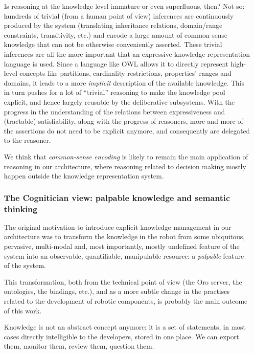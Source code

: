 \documentclass[letterpaper, 10 pt, conference]{ieeeconf}  %
\begin{document}
Is reasoning at the knowledge level immature or even superfluous, then? Not so:
hundreds of trivial (from a human point of view) inferences are continuously
produced by the system (translating inheritance relations, domain/range
constraints, transitivity, etc.) and encode a large amount of common-sense
knowledge that can not be otherwise conveniently asserted. These trivial
inferences are all the more important that an expressive knowledge
representation language is used. Since a language like OWL allows it to
directly represent high-level concepts like partitions, cardinality
restrictions, properties' ranges and domains, it leads to a more
\emph{implicit} description of the available knowledge.  This in turn pushes
for a lot of ``trivial'' reasoning to make the knowledge pool explicit, and
hence largely reusable by the deliberative subsystems. With the progress in the
understanding of the relations between expressiveness and (tractable)
satisfiability, along with the progress of reasoners, more and more of the
assertions do not need to be explicit anymore, and consequently are delegated
to the reasoner.

We think that \emph{common-sense encoding} is likely to remain the main
application of reasoning in our architecture, where reasoning related
to decision making mostly happen outside the knowledge representation system.


\subsubsection{The Cognitician view: palpable knowledge and semantic thinking}

The original motivation to introduce explicit knowledge management in our
architecture was to transform the knowledge in the robot from some ubiquitous,
pervasive, multi-modal and, most importantly, mostly undefined feature of the
system into an observable, quantifiable, manipulable resource: a
\emph{palpable} feature of the system.

This transformation, both from the technical point of view (the {\sc Oro}
server, the ontologies, the bindings, etc.), and as a more subtle change in the
practises related to the development of robotic components, is probably the
main outcome of this work.

Knowledge is not an abstract concept anymore: it is a set of statements, in
most cases directly intelligible to the developers, stored in one place. We can
export them, monitor them, review them, question them.
\end{document}
